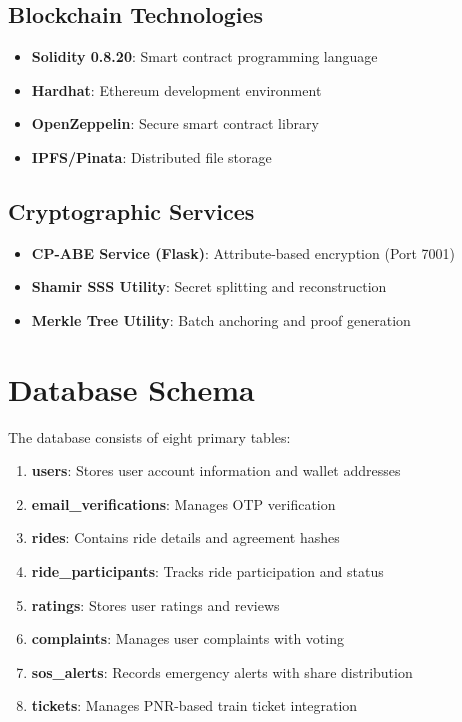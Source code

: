 \subsection{Blockchain Technologies}

\begin{itemize}
    \item \textbf{Solidity 0.8.20}: Smart contract programming language
    \item \textbf{Hardhat}: Ethereum development environment
    \item \textbf{OpenZeppelin}: Secure smart contract library
    \item \textbf{IPFS/Pinata}: Distributed file storage
\end{itemize}

\subsection{Cryptographic Services}

\begin{itemize}
    \item \textbf{CP-ABE Service (Flask)}: Attribute-based encryption (Port 7001)
    \item \textbf{Shamir SSS Utility}: Secret splitting and reconstruction
    \item \textbf{Merkle Tree Utility}: Batch anchoring and proof generation
\end{itemize}

\section{Database Schema}

The database consists of eight primary tables:

\begin{enumerate}
    \item \textbf{users}: Stores user account information and wallet addresses
    \item \textbf{email\_verifications}: Manages OTP verification
    \item \textbf{rides}: Contains ride details and agreement hashes
    \item \textbf{ride\_participants}: Tracks ride participation and status
    \item \textbf{ratings}: Stores user ratings and reviews
    \item \textbf{complaints}: Manages user complaints with voting
    \item \textbf{sos\_alerts}: Records emergency alerts with share distribution
    \item \textbf{tickets}: Manages PNR-based train ticket integration
\end{enumerate}

